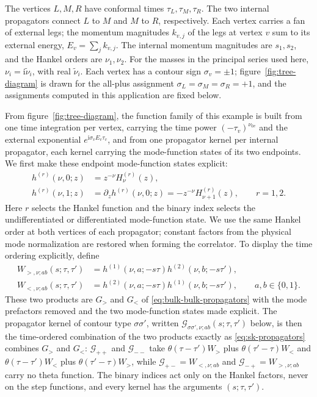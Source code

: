 \documentclass[11pt,a4paper]{article}
\newcommand{\ii}{\mathrm i}
\begin{document}
The vertices $L,M,R$ have conformal times $\tau_L,\tau_M,\tau_R$.
The two internal propagators connect $L$ to $M$ and $M$ to $R$, respectively.
Each vertex carries a fan of external legs; the momentum magnitudes $k_{v,j}$
of the legs at vertex $v$ sum to its external energy, $E_v=\sum_j k_{v,j}$.
The internal momentum magnitudes are $s_1,s_2$, and the Hankel orders are
$\nu_1,\nu_2$. For the masses in the principal series used here,
$\nu_i=\ii\widetilde\nu_i$, with real $\widetilde\nu_i$.
Each vertex has a contour sign $\sigma_v=\pm1$;
figure~\ref{fig:tree-diagram} is drawn for the all-plus assignment
$\sigma_L=\sigma_M=\sigma_R=+1$, and the assignments computed in this
application are fixed below.

From figure~\ref{fig:tree-diagram}, the function family of this example is built from one time
integration per vertex, carrying the time power $(-\tau_v)^{\nu_{0v}}$ and the external exponential
$e^{\ii\sigma_vE_v\tau_v}$, and from one propagator kernel per internal propagator, each kernel
carrying the mode-function states of its two endpoints. We first make these endpoint mode-function
states explicit:
\begin{equation}
 \begin{aligned}
 h^{(r)}(\nu,0;z)&=z^{-\nu}H^{(r)}_\nu(z),\\
 h^{(r)}(\nu,1;z)&=\partial_z h^{(r)}(\nu,0;z)
                  =-z^{-\nu}H^{(r)}_{\nu+1}(z),
 \qquad r=1,2.
 \end{aligned}
 \label{eq:application-endpoint-states}
\end{equation}
Here $r$ selects the Hankel function and the binary index selects the
undifferentiated or differentiated mode-function state. We use the same Hankel order
at both vertices of each propagator; constant factors from the physical mode
normalization are restored when forming the correlator.
To display the time ordering explicitly, define
\begin{equation}
 \begin{aligned}
 W_{>,\nu;ab}(s;\tau,\tau')
 &=h^{(1)}(\nu,a;-s\tau)h^{(2)}(\nu,b;-s\tau'),\\
 W_{<,\nu;ab}(s;\tau,\tau')
 &=h^{(2)}(\nu,a;-s\tau)h^{(1)}(\nu,b;-s\tau'),
 \qquad a,b\in\{0,1\}.
 \end{aligned}
 \label{eq:application-line-products}
\end{equation}
These two products are $G_>$ and $G_<$ of \eqref{eq:bulk-bulk-propagators} with the mode prefactors
removed and the two mode-function states made explicit. The propagator kernel of contour type
$\sigma\sigma'$, written $\mathcal G_{\sigma\sigma',\nu;ab}(s;\tau,\tau')$ below, is then the
time-ordered combination of the two products exactly as \eqref{eq:sk-propagators} combines $G_>$
and $G_<$: $\mathcal G_{++}$ and $\mathcal G_{--}$ take $\theta(\tau-\tau')W_{>}$ plus
$\theta(\tau'-\tau)W_{<}$ and $\theta(\tau-\tau')W_{<}$ plus $\theta(\tau'-\tau)W_{>}$, while
$\mathcal G_{+-}=W_{<,\nu;ab}$ and $\mathcal G_{-+}=W_{>,\nu;ab}$ carry no theta function. The binary
indices act only on the Hankel factors, never on the step functions, and every kernel has the
arguments $(s;\tau,\tau')$.
\end{document}
